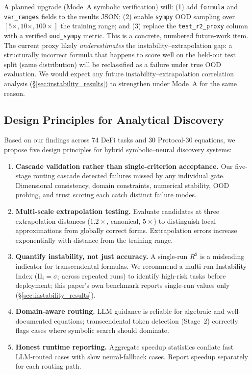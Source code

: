 \documentclass[twoside,11pt]{article}
\newcommand{\Rsq}{R^{2}}
\newcommand{\II}{\mathrm{II}}
\begin{document}
A planned upgrade (Mode~A symbolic verification) will: (1) add \texttt{formula} and
\texttt{var\_ranges} fields to the results JSON; (2) enable \texttt{sympy} OOD
sampling over $[5\times, 10\times, 100\times]$ the training range; and (3) replace
the \texttt{test\_r2\_proxy} column with a verified \texttt{ood\_sympy} metric.
This is a concrete, numbered future-work item.  The current proxy likely
\emph{underestimates} the instability--extrapolation gap: a structurally incorrect
formula that happens to score well on the held-out test split (same distribution)
will be reclassified as a failure under true OOD evaluation. We would expect any
future instability--extrapolation correlation analysis (\S\ref{sec:instability_results})
to strengthen under Mode~A for the same reason.

\subsection{Design Principles for Analytical Discovery}\label{subsec:design-principles-for-analytical-discove}
\label{sec:disc_principles}

Based on our findings across 74 DeFi tasks and 30 Protocol-30 equations, we propose five design principles for hybrid symbolic--neural discovery systems:

\begin{enumerate}
  \item \textbf{Cascade validation rather than single-criterion acceptance.} Our five-stage routing cascade detected failures missed by any individual gate. Dimensional consistency, domain constraints, numerical stability, OOD probing, and trust scoring each catch distinct failure modes.
  \item \textbf{Multi-scale extrapolation testing.} Evaluate candidates at three extrapolation distances ($1.2\times$, canonical, $5\times$) to distinguish local approximations from globally correct forms. Extrapolation errors increase exponentially with distance from the training range.
  \item \textbf{Quantify instability, not just accuracy.} A single-run $\Rsq$ is a misleading indicator for transcendental formulas. We recommend a multi-run Instability Index ($\II_i = \sigma_i$ across repeated runs) to identify high-risk tasks before deployment; this paper's own benchmark reports single-run values only (\S\ref{sec:instability_results}).
  \item \textbf{Domain-aware routing.} LLM guidance is reliable for algebraic and well-documented equations; transcendental token detection (Stage~2) correctly flags cases where symbolic search should dominate.
  \item \textbf{Honest runtime reporting.} Aggregate speedup statistics conflate fast LLM-routed cases with slow neural-fallback cases. Report speedup separately for each routing path.
\end{enumerate}
\end{document}

